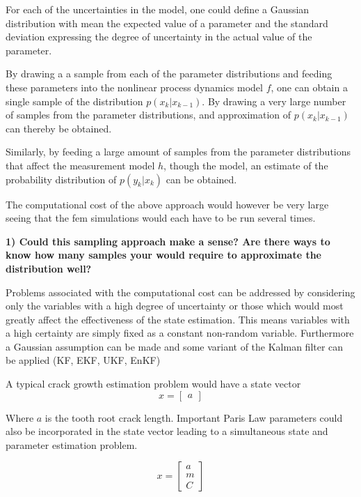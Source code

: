 For each of the uncertainties in the model, one could define a Gaussian distribution with mean the expected value of a parameter and the standard deviation expressing the degree of uncertainty in the actual value of the parameter. 

By drawing a a sample from each of the parameter distributions and feeding these parameters into the nonlinear process dynamics model $f$, one can obtain a single sample of the distribution $p\left(x_{k} | x_{k-1}\right)$. By drawing a very large number of samples from the parameter distributions, and approximation of $p\left(x_{k} | x_{k-1}\right)$ can thereby be obtained.

Similarly, by feeding a large amount of samples from the parameter distributions that affect the measurement model $h$, though the model, an estimate of the probability distribution of $p\left(y_{k} | x_{k}\right)$ can be obtained.

The computational cost of the above approach would however be very large seeing that the fem simulations would each have to be run several times.

\textbf{1) Could this sampling approach make a sense? Are there ways to know how many samples your would require to approximate the distribution well?}

Problems associated with the computational cost  can be addressed by considering only the variables with a high degree of uncertainty or those which would most greatly affect the effectiveness of the state estimation. This means variables with a high certainty are simply fixed as a constant non-random variable. Furthermore a Gaussian assumption can be made and some variant of the Kalman filter can be applied (KF, EKF, UKF, EnKF)

A typical crack growth estimation problem would have a state vector
\begin{equation}
x =	\left[\begin{array}{l}
a
\end{array}\right]
\end{equation}

Where $a$ is the tooth root crack length. Important Paris Law parameters could also be incorporated in the state vector leading to a simultaneous state and parameter estimation problem.

\begin{equation}
x = \left[\begin{array}{l}
a \\
m\\
C
\end{array}\right]
\end{equation}


